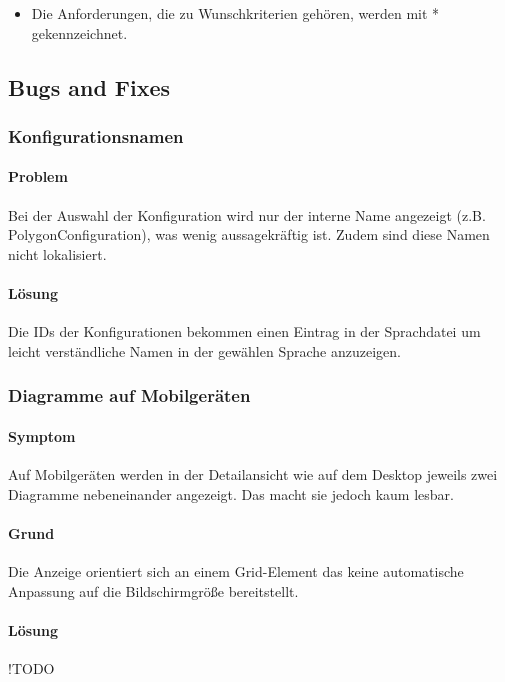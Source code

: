 \begin{itemize}
  \item Die Anforderungen, die zu Wunschkriterien gehören, werden mit * gekennzeichnet.
\end{itemize}

\setcounter{counter}{10}

\subsection{Bugs and Fixes}

\subsubsection{Konfigurationsnamen}
\paragraph{Problem}
Bei der Auswahl der Konfiguration wird nur der interne Name angezeigt (z.B. PolygonConfiguration),
was wenig aussagekräftig ist. Zudem sind diese Namen nicht lokalisiert.

\paragraph{Lösung}
Die IDs der Konfigurationen bekommen einen Eintrag in der Sprachdatei um leicht verständliche
Namen in der gewählen Sprache anzuzeigen.

\subsubsection{Diagramme auf Mobilgeräten}
\paragraph{Symptom}
Auf Mobilgeräten werden in der Detailansicht wie auf dem Desktop jeweils zwei Diagramme nebeneinander angezeigt.
Das macht sie jedoch kaum lesbar.

\paragraph{Grund}
Die Anzeige orientiert sich an einem Grid-Element das keine automatische Anpassung auf 
die Bildschirmgröße bereitstellt.

\paragraph{Lösung}
!TODO

